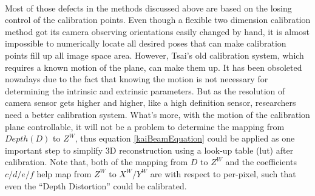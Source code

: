%
%
\\\indent
Most of those defects in the methods discussed above are based on the losing control of the calibration points. Even though a flexible two dimension calibration method got its camera observing orientations easily changed by hand, it is almost impossible to numerically locate all desired poses that can make calibration points fill up all image space area. However, Tsai's old calibration system, which requires a known motion of the plane, can make them up. It has been obsoleted nowadays due to the fact that knowing the motion is not necessary for determining the intrinsic and extrinsic parameters. But as the resolution of camera sensor gets higher and higher, like a high definition sensor, researchers need a better calibration system. What's more, with the motion of the calibration plane controllable, it will not be a problem to determine the mapping from \(Depth (D)\) to \(Z^W\), thus equation \ref{kaiBeamEquation} could be applied as one important step to simplify 3D reconstruction using a look-up table (lut) after calibration. Note that, both of the mapping from \(D\) to \(Z^W\) and the coefficients \(c/d/e/f\) help map from \(Z^W\) to \(X^W/Y^W\) are with respect to per-pixel, such that even the \enquote{Depth Distortion} could be calibrated.

